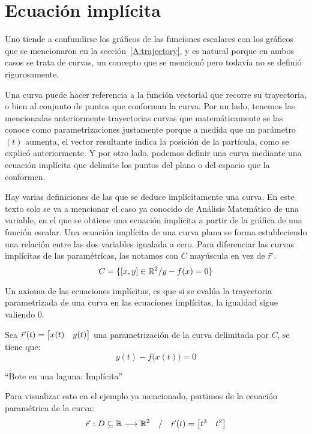 \section{Ecuación implícita}

Uno tiende a confundirse los gráficos de las funciones escalares con los gráficos que se mencionaron en la sección~\ref{A:trajectory}, y es natural porque en ambos casos se trata de curvas, un concepto que se mencionó pero todavía no se definió rigurosamente.

Una curva puede hacer referencia a la función vectorial que recorre su trayectoria, o bien al conjunto de puntos que conforman la curva.
Por un lado, tenemos las mencionadas anteriormente trayectorias curvas que matemáticamente se las conoce como parametrizaciones justamente porque a medida que un parámetro $(t)$ aumenta, el vector resultante indica la posición de la partícula, como se explicó anteriormente.
Y por otro lado, podemos definir una curva mediante una ecuación implícita que delimite los puntos del plano o del espacio que la conformen.

Hay varias definiciones de las que se deduce implícitamente una curva.
En este texto solo se va a mencionar el caso ya conocido de Análisis Matemático de una variable, en el que se obtiene una ecuación implícita a partir de la gráfica de una función escalar.
Una ecuación implícita de una curva plana se forma estableciendo una relación entre las dos variables igualada a cero.
Para diferenciar las curvas implícitas de las paramétricas, las notamos con $C$ mayúscula en vez de $\vec{r}\hspace{0.05cm}$.
\[
C = \{ [x,y] \in \mathbb{R}^2 / y-f(x)=0 \}
\]

Un axioma de las ecuaciones implícitas, es que si se evalúa la trayectoria parametrizada de una curva en las ecuaciones implícitas, la igualdad sigue valiendo 0.

Sea $\vec{r}\hspace{0.05cm}(t) = \begin{bmatrix}x(t) & y(t)\end{bmatrix}$ una parametrización de la curva delimitada por $C$, se tiene que:
\[
y(t) - f \big( x(t) \big) =0
\]

\begin{example}
  ``Bote en una laguna: Implícita''
\end{example}

Para visualizar esto en el ejemplo ya mencionado, partimos de la ecuación paramétrica de la curva:
\[
  \vec{r}\hspace{0.05cm}:D \subseteq \mathbb{R} \longrightarrow \mathbb{R}^2 \quad / \quad \vec{r}\hspace{0.05cm}(t) =
  \begin{bmatrix}
      t^3 & t^2
  \end{bmatrix}
\]

